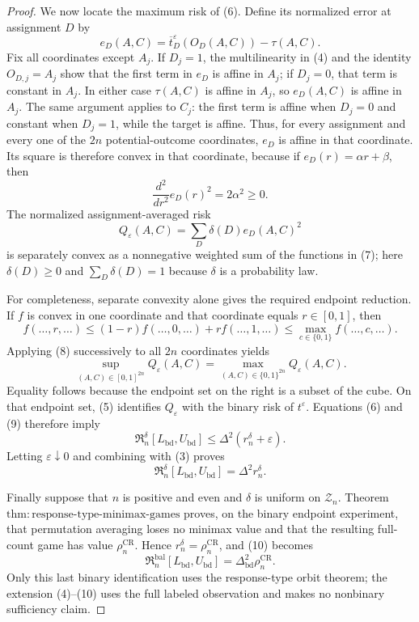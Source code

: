 \documentclass{article}
\begin{document}
\begin{proof}
We now locate the maximum risk of (6).  Define its normalized error at assignment \(D\) by
\[
 e_D(A,C)=\overline t_D^\varepsilon(O_D(A,C))-\tau(A,C).
\]
Fix all coordinates except \(A_j\).  If \(D_j=1\), the multilinearity in (4) and the identity \(O_{D,j}=A_j\) show that the first term in \(e_D\) is affine in \(A_j\); if \(D_j=0\), that term is constant in \(A_j\).  In either case \(\tau(A,C)\) is affine in \(A_j\), so \(e_D(A,C)\) is affine in \(A_j\).  The same argument applies to \(C_j\): the first term is affine when \(D_j=0\) and constant when \(D_j=1\), while the target is affine.  Thus, for every assignment and every one of the \(2n\) potential-outcome coordinates, \(e_D\) is affine in that coordinate.  Its square is therefore convex in that coordinate, because if \(e_D(r)=\alpha r+\beta\), then
\[
 \frac{d^2}{dr^2}e_D(r)^2=2\alpha^2\geq0. \tag{7}
\]
The normalized assignment-averaged risk
\[
 Q_\varepsilon(A,C)=\sum_D\delta(D)e_D(A,C)^2
\]
is separately convex as a nonnegative weighted sum of the functions in (7); here \(\delta(D)\geq0\) and \(\sum_D\delta(D)=1\) because \(\delta\) is a probability law.

For completeness, separate convexity alone gives the required endpoint reduction.  If \(f\) is convex in one coordinate and that coordinate equals \(r\in[0,1]\), then
\[
 f(\ldots,r,\ldots)
 \leq(1-r)f(\ldots,0,\ldots)+r f(\ldots,1,\ldots)
 \leq\max_{c\in\{0,1\}}f(\ldots,c,\ldots). \tag{8}
\]
Applying (8) successively to all \(2n\) coordinates yields
\[
 \sup_{(A,C)\in[0,1]^{2n}}Q_\varepsilon(A,C)
 =\max_{(A,C)\in\{0,1\}^{2n}}Q_\varepsilon(A,C). \tag{9}
\]
Equality follows because the endpoint set on the right is a subset of the cube.  On that endpoint set, (5) identifies \(Q_\varepsilon\) with the binary risk of \(t^\varepsilon\).  Equations (6) and (9) therefore imply
\[
 \mathfrak R_n^\delta[L_{\mathrm{bd}},U_{\mathrm{bd}}]
 \leq\Delta^2(r_n^\delta+\varepsilon).
\]
Letting \(\varepsilon\downarrow0\) and combining with (3) proves
\[
 \mathfrak R_n^\delta[L_{\mathrm{bd}},U_{\mathrm{bd}}]
 =\Delta^2r_n^\delta. \tag{10}
\]

Finally suppose that \(n\) is positive and even and \(\delta\) is uniform on \(\mathcal Z_n\).  Theorem \(\mathrm{thm{:}response\mbox{-}type\mbox{-}minimax\mbox{-}games}\) proves, on the binary endpoint experiment, that permutation averaging loses no minimax value and that the resulting full-count game has value \(\rho_n^{\mathrm{CR}}\).  Hence \(r_n^\delta=\rho_n^{\mathrm{CR}}\), and (10) becomes
\[
 \mathfrak R_n^{\mathrm{bal}}[L_{\mathrm{bd}},U_{\mathrm{bd}}]
 =\Delta_{\mathrm{bd}}^2\rho_n^{\mathrm{CR}}.
\]
Only this last binary identification uses the response-type orbit theorem; the extension (4)--(10) uses the full labeled observation and makes no nonbinary sufficiency claim.
\end{proof}
\end{document}
